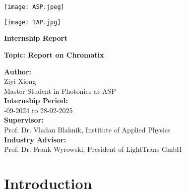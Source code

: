 \documentclass[a4paper,12pt]{report}
\begin{document}
\begin{titlepage}
    \begin{minipage}[t]{0.5\textwidth}
        \texttt{[image: ASP.jpeg]}
    \end{minipage}
    \hfill
    \begin{minipage}[t]{0.5\textwidth}
        \raggedleft
        \texttt{[image: IAP.jpg]}
    \end{minipage}


    \vspace{1cm}

    {\Huge\centering\bfseries Internship Report\\[0.5cm]}
    \vspace{1cm}

    \raggedright
    \large

    {\centering\bfseries Topic: Report on Chromatix\\}

    \vspace{2cm}

    \centering\textbf{Author:}\\[0.5cm]
    \centering Ziyi Xiong\\[0.5cm]
    \centering Master Student in Photonics at ASP\\[0.5cm]
    
    \centering\textbf{Internship Period:}\\[0.5cm] 
    -09-2024 to 28-02-2025\\[0.5cm]
    
    \centering \textbf{Supervisor:} \\[0.5cm]
    \centering Prof. Dr. Vladan Blahnik, Institute of Applied Physics\\[0.5cm]
    
    \centering\textbf{Industry Advisor:} \\[0.5cm]
    \centering Prof. Dr. Frank Wyrowski, President of LightTrans GmbH\\

    \vfill
\end{titlepage}


\tableofcontents
\newpage

\chapter{Introduction}
\end{document}
